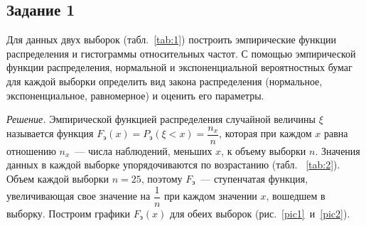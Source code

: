












\subsection*{\hspace*{\parindent}Задание 1} 
Для данных двух выборок (табл.~\ref{tab:1}) построить эмпирические функции 
распределения и гистограммы относительных частот. С помощью эмпирической 
функции распределения, нормальной и экспоненциальной вероятностных бумаг 
для каждой выборки определить вид закона распределения (нормальное, 
экспоненциальное, равномерное) и оценить его параметры. 

\par
{\em Решение.}
Эмпирической функцией распределения случайной величины $\xi$ 
называется функция $F_\text{э}(x) = P_\text{э}(\xi < x) = \dfrac{n_x}{n}$, 
которая при каждом $x$ равна отношению $n_x$~--- числа наблюдений, 
меньших $x$, к объему выборки $n$.
Значения данных в каждой выборке упорядочиваются по возрастанию 
(табл. ~\ref{tab:2}).
Объем 
каждой выборки $n = 25$,
 поэтому $F_\text{э}$~--- ступенчатая функция, увеличивающая 
свое значение на $\dfrac{1}{n}$ при каждом значении $x$, вошедшем в выборку. 
Построим графики $F_\text{э}(x)$ для обеих выборок (рис.~\ref{pic1}~и~\ref{pic2}).

